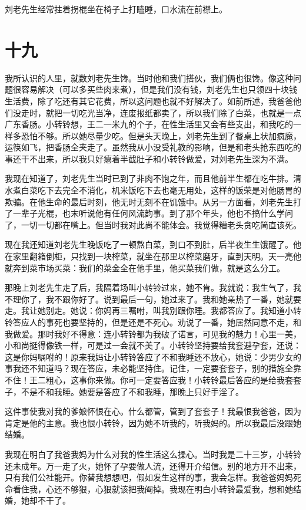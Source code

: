 刘老先生经常拄着拐棍坐在椅子上打瞌睡，口水流在前襟上。

\section{十九}

我所认识的人里，就数刘老先生馋。当时他和我们搭伙，我们俩也很馋。像这种问题很容易解决（可以多买些肉来煮），但是我们没有钱，刘老先生也只领四十块钱生活费，除了吃还有其它花费，所以这问题也就不好解决了。如前所述，我爸爸他们没走时，就把一切吃光当净，连废报纸都卖了，所以我们除了白菜，也就是一点广东香肠。小转铃想，王二一米九的个子，在性生活里又会有些支出，和我吃的一样多恐怕不够。所以她尽量少吃。但是头天晚上，刘老先生到了餐桌上状加疯魔，运筷如飞，把香肠全夹走了。虽然我从小没受礼教的影响，但是和老头抢东西吃的事还干不出来，所以我只好瘪着半截肚子和小转铃做爱，对刘老先生深为不满。 

我现在知道了，刘老先生当时已到了非肉不饱之年，而且他前半生都在吃牛排。清水煮白菜吃下去完全不消化，机米饭吃下去也毫无用处，这样的饭荣是对他肠胃的欺骗。在他生命的最后时刻，他无时无刻不在饥饿中。从另一方面看，刘老先生打了一辈子光棍，也末听说他有任何风流韵事。到了那个年头，他也不搞什么学问了，一切一切都在嘴上。但当时我对此尚不能体会。我觉得糟老头贪吃简直该死。 

现在我还知道刘老先生晚饭吃了一顿熬白菜，到口不到肚，后半夜生生饿醒了。他在家里翻箱倒柜，只找到一块榨菜，就坐在那里以榨菜磨牙，直到天明。天一亮他就奔到菜市场买菜：我们的菜金全在他手里，他买菜我们做，就是这么分工。 


那晚上刘老先生走了后，我隔着场叫小转铃过来，她不肯。我就说：我生气了，我不理你了，我不跟你好了。说到最后一句，她过来了。我和她亲热了一番，她就要走。我让她别走。她说：你妈再三嘱咐，叫我别跟你睡。我都答应了。我知道小转铃答应人的事死也要坚持的，但是还是不死心。劝说了一番，她居然同意不走，和我做爱。那时我好不得意：连小转铃都为我破了诺言，可见我的魅力！心里一美，小和尚挺得像铁一样，可是过一会就不美了。小转铃坚持要给我套避孕套，还说：这是你妈嘱咐的！原来我妈让小转铃答应了不和我睡还不放心，她说：少男少女的事我还不知道吗？现在答应，未必能坚持住。记住，一定要套套子，别的措施全靠不住！王二粗心，这事你来做。你可一定要答应我！小转铃最后答应的是给我套套子，不是不和我睡。她要是答应了不和我睡，那晚上只好手淫了。 

这件事使我对我的爹娘怀恨在心。什么都管，管到了套套子！我最恨我爸爸，因为肯定是他的主意。我也恨小转铃，因为她不听我的，听我妈的。所以我最后没跟她结婚。 

我现在明白了我爸我妈为什么对我的性生活这么操心。当时我是二十三岁，小转铃还未成年。万一走了火，她怀了孕要做人流，还得开介绍信。别的地方开不出来，只有我们公社能开。你替我想想吧，假如发生这样的事，我会怎样。我爸爸妈妈死命看住我，心还不够狠，心狠就该把我阉掉。我现在明白小转铃最爱我，想和她结婚，她却不干了。 

